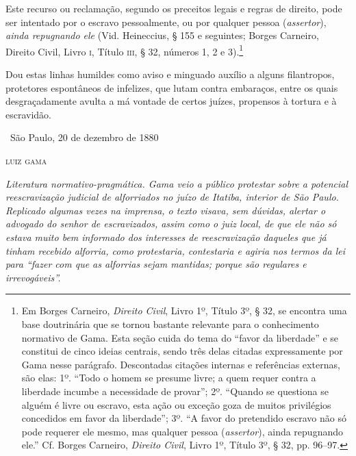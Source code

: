 {
Este recurso ou reclamação, segundo os preceitos legais e regras de
direito, pode ser intentado por o escravo pessoalmente, ou por qualquer
pessoa (\emph{assertor}), \emph{ainda repugnando ele} (Vid.
Heineccius, § 155 e seguintes; Borges Carneiro, Direito Civil,
Livro \textsc{i}, Título \textsc{iii}, § 32, números 1, 2 e 3).\footnote{Em Borges
  Carneiro, \emph{Direito Civil}, Livro 1º, Título 3º, § 32, se encontra
  uma base doutrinária que se tornou bastante relevante para o
  conhecimento normativo de Gama. Esta seção cuida do tema do ``favor da
  liberdade'' e se constitui de cinco ideias centrais, sendo três delas
  citadas expressamente por Gama nesse parágrafo. Descontadas citações
  internas e referências externas, são elas: 1º. ``Todo o homem se
  presume livre; a quem requer contra a liberdade incumbe a necessidade
  de provar''; 2º. ``Quando se questiona se alguém é livre ou
  escravo, esta ação ou exceção goza de muitos privilégios concedidos em
  favor da liberdade''; 3º. ``A favor do pretendido escravo não só pode
  requerer ele mesmo, mas qualquer pessoa (\emph{assertor}), ainda
  repugnando ele.'' Cf. Borges Carneiro, \emph{Direito Civil}, Livro 1º,
  Título 3º, § 32, pp. 96--97.}

Dou estas linhas humildes
como aviso e minguado auxílio a alguns filantropos, protetores
espontâneos de infelizes, que lutam contra embaraços, entre os quais
desgraçadamente avulta a má vontade de certos juízes, propensos à
tortura e à escravidão.

\medskip

\hfill\ São Paulo, 20 de dezembro de 1880

\hfill\textsc{luiz gama}


\begin{resumo}
\emph{Literatura normativo-pragmática. Gama veio a público protestar
sobre a potencial reescravização judicial de alforriados no juízo de
Itatiba, interior de São Paulo. Replicado algumas vezes na imprensa, o
texto visava, sem dúvidas, alertar o advogado do senhor de escravizados,
assim como o juiz local, de que ele não só estava muito bem informado
dos interesses de reescravização daqueles que já tinham recebido
alforria, como protestaria, contestaria e agiria nos termos da lei para
``fazer com que as alforrias sejam mantidas; porque são regulares e
irrevogáveis''. }
\end{resumo}

}
